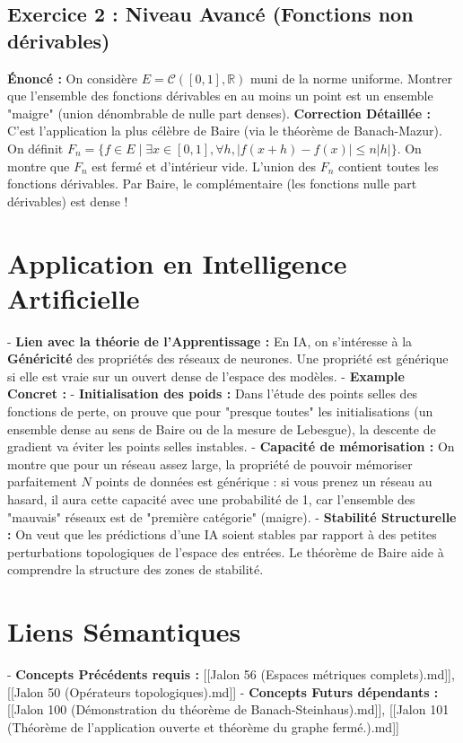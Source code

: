 \documentclass[11pt,a4paper]{article}
\begin{document}
\subsection{Exercice 2 : Niveau Avancé (Fonctions non dérivables)}
\textbf{Énoncé :} On considère $E = \mathcal{C}([0, 1], \mathbb{R})$ muni de la norme uniforme. Montrer que l'ensemble des fonctions dérivables en au moins un point est un ensemble "maigre" (union dénombrable de nulle part denses).
\textbf{Correction Détaillée :}
C'est l'application la plus célèbre de Baire (via le théorème de Banach-Mazur). On définit $F_n = \{ f \in E \mid \exists x \in [0, 1], \forall h, |f(x+h)-f(x)| \le n|h| \}$. On montre que $F_n$ est fermé et d'intérieur vide. L'union des $F_n$ contient toutes les fonctions dérivables. Par Baire, le complémentaire (les fonctions nulle part dérivables) est dense !

\section{Application en Intelligence Artificielle}

- \textbf{Lien avec la théorie de l'Apprentissage :} En IA, on s'intéresse à la \textbf{Généricité} des propriétés des réseaux de neurones. Une propriété est générique si elle est vraie sur un ouvert dense de l'espace des modèles.
- \textbf{Example Concret :}
    - \textbf{Initialisation des poids :} Dans l'étude des points selles des fonctions de perte, on prouve que pour "presque toutes" les initialisations (un ensemble dense au sens de Baire ou de la mesure de Lebesgue), la descente de gradient va éviter les points selles instables.
    - \textbf{Capacité de mémorisation :} On montre que pour un réseau assez large, la propriété de pouvoir mémoriser parfaitement $N$ points de données est générique : si vous prenez un réseau au hasard, il aura cette capacité avec une probabilité de 1, car l'ensemble des "mauvais" réseaux est de "première catégorie" (maigre).
    - \textbf{Stabilité Structurelle :} On veut que les prédictions d'une IA soient stables par rapport à des petites perturbations topologiques de l'espace des entrées. Le théorème de Baire aide à comprendre la structure des zones de stabilité.

\section{Liens Sémantiques}

- \textbf{Concepts Précédents requis :} [[Jalon 56 (Espaces métriques complets).md]], [[Jalon 50 (Opérateurs topologiques).md]]
- \textbf{Concepts Futurs dépendants :} [[Jalon 100 (Démonstration du théorème de Banach-Steinhaus).md]], [[Jalon 101 (Théorème de l'application ouverte et théorème du graphe fermé.).md]]
\end{document}
